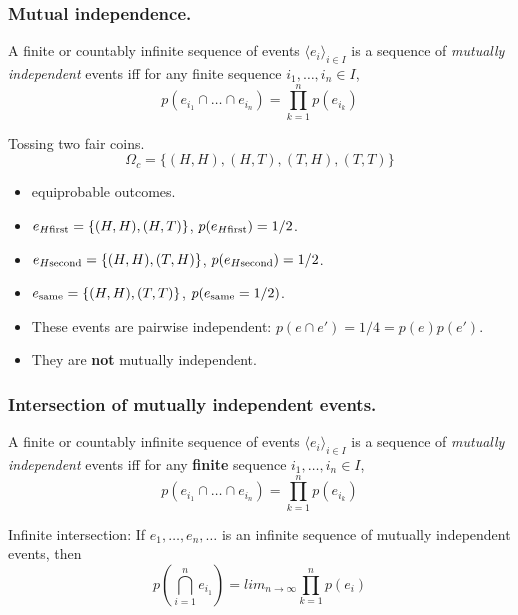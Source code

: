 \documentclass{beamer}
\begin{document}
\begin{frame}
  \frametitle{Mutual independence.}
  A finite or countably infinite sequence of events $\langle e_i \rangle_{i \in I}$ is a sequence of \emph{mutually independent} events iff for any finite sequence $i_1, \dots, i_n \in I$,
  \[p(e_{i_1} \cap \dots \cap e_{i_n}) = \prod^n_{k=1} p(e_{i_k})\]
\end{frame}

\begin{frame}
  \begin{exampleblock}{Tossing two fair coins.}
    \[\Omega_{c} = \{ (H,H), (H, T), (T, H), (T, T) \} \]
    \begin{itemize}
    \item equiprobable outcomes.
    \item $e_{H \textnormal{first}} = \{(H,H), (H,T)\}$, $p(e_{H \textnormal{first}}) = 1/2$.
    \item $e_{H \textnormal{second}} = \{(H,H), (T,H)\}$, $p(e_{H \textnormal{second}}) = 1/2$.
    \item $e_{\textnormal{same}} = \{(H,H), (T,T)\}$, $p(e_{\textnormal{same}} = 1/2)$.
    \item These events are pairwise independent: $p(e \cap e') = 1/4 = p(e)p(e')$.
    \item They are \textbf{not} mutually independent.
    \end{itemize}
  \end{exampleblock}
\end{frame}
    

\begin{frame}
  \frametitle{Intersection of mutually independent events.}
  A finite or countably infinite sequence of events $\langle e_i \rangle_{i \in I}$ is a sequence of \emph{mutually independent} events iff for any \textbf{finite} sequence $i_1, \dots, i_n \in I$,
  \[p(e_{i_1} \cap \dots \cap e_{i_n}) = \prod^n_{k=1} p(e_{i_k})\]

  \begin{block}{Infinite intersection:}
    If $e_1, \dots, e_n, \dots$ is an infinite sequence of mutually independent events, then
    \[p(\bigcap^{n}_{i=1} e_{i_1} ) = lim_{n \rightarrow \infty} \prod^{n}_{k=1} p(e_{i})\]
  \end{block}
  
\end{frame}
\end{document}
